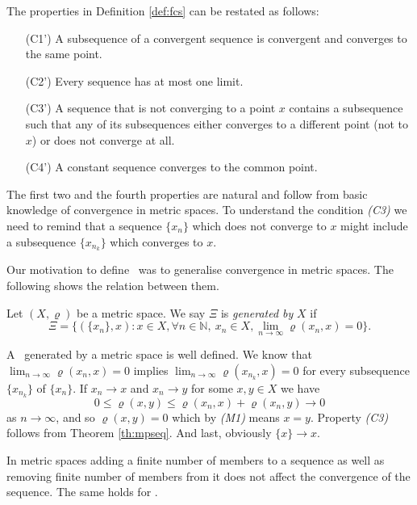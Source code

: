 The properties in Definition \ref{def:fcs} can be restated as follows:
\begin{enumerate}
	\item[(C1')] A subsequence of a convergent sequence is convergent and converges to the same point.
	\item[(C2')] Every sequence has at most one limit.
	\item[(C3')] A sequence that is not converging to a point $x$ contains a subsequence such that any of its subsequences either converges to a different point (not to $x$) or does not converge at all.
	\item[(C4')] A constant sequence converges to the common point.
\end{enumerate}
The first two and the fourth properties are natural and follow from basic knowledge of convergence in metric spaces. To understand the condition \emph{(C3)} we need to remind that a sequence $\{x_n\}$ which does not converge to $x$ might include a subsequence $\{x_{n_k}\}$ which converges to $x$.

Our motivation to define \fcss\ was to generalise convergence in metric spaces. The following shows the relation between them.

\begin{define}\label{def:gen}
Let $(X,\varrho)$ be a metric space. We say $\Xi$ is \emph{generated by} $X$ if 
\[
	\Xi=\{(\{x_n\},x): x\in X, \forall n\in \mathbb{N}, \ x_n\in X, \lim_{n \to \infty} \varrho(x_n,x)=0\}.
\]
\end{define}

A \fcs\ generated by a metric space is well defined. We know that $\lim_{n\to\infty}\varrho(x_n,x)=0$ implies $\lim_{n\to\infty}\varrho(x_{n_k},x)=0$ for every subsequence $\{x_{n_k}\}$ of $\{x_n\}$. If $x_n\to x$ and $x_n\to y$ for some $x,y\in X$ we have
\[
	0\le\varrho(x,y)\le\varrho(x_n,x)+\varrho(x_n,y)\to 0
\]
as $n\to\infty$, and so $\varrho(x,y)=0$ which by \emph{(M1)} means $x=y$. Property \emph{(C3)} follows from Theorem \ref{th:mpseq}. And last, obviously $\{x\}\to x$. 

In metric spaces adding a finite number of members to a sequence as well as removing finite number of members from it does not affect the convergence of the sequence. The same holds for \fcss.

